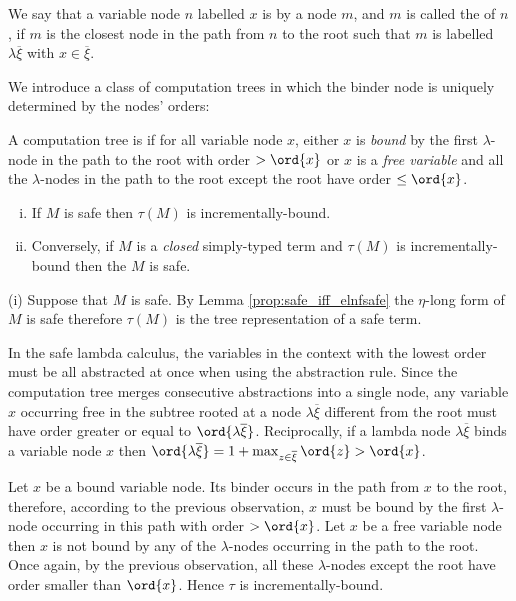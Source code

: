 We say that a variable node $n$ labelled $x$ is  by a
node $m$, and $m$ is called the  of $n$, if $m$ is
the closest node in the path from $n$ to the root such that $m$ is
labelled $\lambda \overline{\xi}$ with $x\in \overline{\xi}$.


We introduce a class of computation trees in which the binder node
is uniquely determined by the nodes' orders:
\begin{definition}\rm
  A computation tree is  if for all
  variable node $x$, either $x$ is \emph{bound} by the first
  $\lambda$-node in the path to the root with order $> \ord{x}$ or $x$
  is a \emph{free variable} and all the $\lambda$-nodes in the path to
  the root except the root have order $\leq \ord{x}$.
\end{definition}

\begin{proposition} \hfill
\label{prop:safe_imp_incrbound}
\begin{enumerate}[(i)]
\item If $M$ is safe then $\tau(M)$ is incrementally-bound.
\item Conversely, if $M$ is a \emph{closed} simply-typed term and $\tau(M)$
is incrementally-bound then the $M$ is safe.
\end{enumerate}
\end{proposition}
\proof
  (i) Suppose that $M$ is safe. By Lemma
  \ref{prop:safe_iff_elnfsafe} the $\eta$-long form of $M$ is safe
  therefore $\tau(M)$ is the tree representation of a safe term.

In the safe lambda calculus, the variables in the context with the
lowest order must be all abstracted at once when using the
abstraction rule. Since the computation tree merges consecutive
abstractions into a single node, any variable $x$ occurring free in
the subtree rooted at a node $\lambda \overline{\xi}$ different from
the root must have order greater or equal to $\ord{\lambda
  \overline{\xi}}$. Reciprocally, if a lambda node $\lambda
\overline{\xi}$ binds a variable node $x$ then $\ord{\lambda
  \overline{\xi}} = 1+\max_{z\in\overline{\xi}} \ord{z} > \ord{x}$.

Let $x$ be a bound variable node. Its binder occurs in the path from
$x$ to the root, therefore, according to the previous observation,
$x$ must be bound by the first $\lambda$-node occurring in this path
with order $>\ord{x}$. Let $x$ be a free variable node then $x$ is
not bound by any of the $\lambda$-nodes occurring in the path to the
root. Once again, by the previous observation, all these
$\lambda$-nodes except the root have order smaller than $\ord{x}$.
Hence $\tau$ is incrementally-bound.

